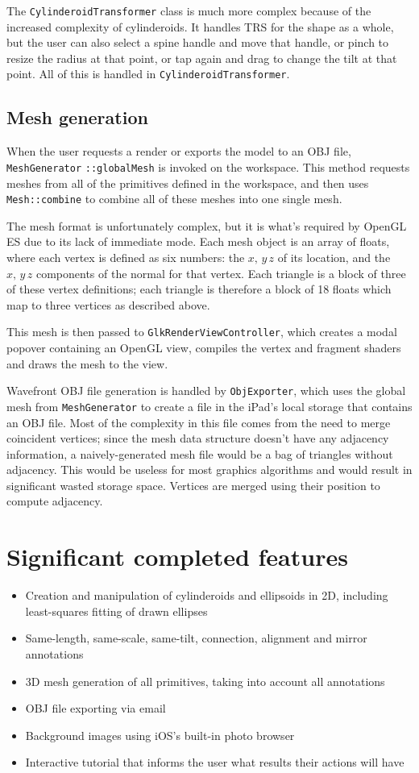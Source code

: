 The \verb#CylinderoidTransformer# class is much more complex because of the
increased complexity of cylinderoids. It handles TRS for the shape as a whole,
but the user can also select a spine handle and move that handle, or pinch to
resize the radius at that point, or tap again and drag to change the tilt at
that point. All of this is handled in \verb#CylinderoidTransformer#.

\subsection{Mesh generation}
When the user requests a render or exports the model to an OBJ file,
\verb#MeshGenerator# \verb#::globalMesh# is invoked on the workspace. This method
requests meshes from all of the primitives defined in the workspace, and then
uses \verb#Mesh::combine# to combine all of these meshes into one single mesh.

The mesh format is unfortunately complex, but it is what's required by OpenGL ES
due to its lack of immediate mode. Each mesh object is an array of floats, where
each vertex is defined as six numbers: the $x,\,y\,z$ of its location, and the
$x,\,y\,z$ components of the normal for that vertex. Each triangle is a block of
three of these vertex definitions; each triangle is therefore a block of 18
floats which map to three vertices as described above.

This mesh is then passed to \verb#GlkRenderViewController#, which creates a
modal popover containing an OpenGL view, compiles the vertex and fragment
shaders and draws the mesh to the view.

Wavefront OBJ file generation is handled by \verb#ObjExporter#, which uses the
global mesh from \verb#MeshGenerator# to create a file in the iPad's local
storage that contains an OBJ file. Most of the complexity in this file comes
from the need to merge coincident vertices; since the mesh data structure
doesn't have any adjacency information, a naively-generated mesh file would be a
bag of triangles without adjacency. This would be useless for most graphics
algorithms and would result in significant wasted storage space. Vertices are
merged using their position to compute adjacency.

\section{Significant completed features}
\begin{itemize}
\item Creation and manipulation of cylinderoids and ellipsoids in 2D, including
least-squares fitting of drawn ellipses
\item Same-length, same-scale, same-tilt, connection, alignment and mirror
annotations
\item 3D mesh generation of all primitives, taking into account all annotations
\item OBJ file exporting via email
\item Background images using iOS's built-in photo browser
\item Interactive tutorial that informs the user what results their actions will
have
\end{itemize}

